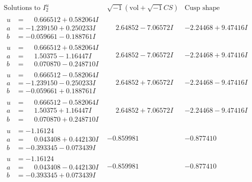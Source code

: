 \documentclass[1p]{elsarticle_modified}
\theoremstyle{definition}
\newcommand{\I}{\sqrt{-1}}
\begin{document}
$$\begin{array}{c|c|c}  
\text{Solutions to }I^u_{2}& \I (\text{vol} + \sqrt{-1}CS) & \text{Cusp shape}\\
 \hline 
\begin{aligned}
u &= \phantom{-}0.666512 + 0.582064 I \\
a &= -1.239150 + 0.250233 I \\
b &= -0.059661 - 0.188761 I\end{aligned}
 & \phantom{-}2.64852 - 7.06572 I & -2.24468 + 9.47416 I \\ \hline\begin{aligned}
u &= \phantom{-}0.666512 + 0.582064 I \\
a &= \phantom{-}1.50375 - 1.16447 I \\
b &= \phantom{-}0.070870 - 0.248710 I\end{aligned}
 & \phantom{-}2.64852 - 7.06572 I & -2.24468 + 9.47416 I \\ \hline\begin{aligned}
u &= \phantom{-}0.666512 - 0.582064 I \\
a &= -1.239150 - 0.250233 I \\
b &= -0.059661 + 0.188761 I\end{aligned}
 & \phantom{-}2.64852 + 7.06572 I & -2.24468 - 9.47416 I \\ \hline\begin{aligned}
u &= \phantom{-}0.666512 - 0.582064 I \\
a &= \phantom{-}1.50375 + 1.16447 I \\
b &= \phantom{-}0.070870 + 0.248710 I\end{aligned}
 & \phantom{-}2.64852 + 7.06572 I & -2.24468 - 9.47416 I \\ \hline\begin{aligned}
u &= -1.16124\phantom{ +0.000000I} \\
a &= \phantom{-}0.043408 + 0.442130 I \\
b &= -0.393345 - 0.073439 I\end{aligned}
 & -0.859981\phantom{ +0.000000I} & -0.877410\phantom{ +0.000000I} \\ \hline\begin{aligned}
u &= -1.16124\phantom{ +0.000000I} \\
a &= \phantom{-}0.043408 - 0.442130 I \\
b &= -0.393345 + 0.073439 I\end{aligned}
 & -0.859981\phantom{ +0.000000I} & -0.877410\phantom{ +0.000000I} \\ \hline\begin{aligned}

\end{aligned}
\end{array}$$
\end{document}
